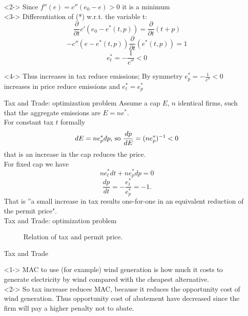 	<2-> Since $f''(e)=c''(e_0-e)>0$ it is a minimum \\


	<3-> Differentiation of (*) w.r.t. the variable t:
\[
\frac{\partial}{\partial{t}}c'(e_0-e^*(t,p))=\frac{\partial}{\partial{t}}(t+p)
\]
\[
-c''(e-e^*(t,p)) \frac{\partial}{\partial{t}} (e^*(t,p))=1
\]
\[
e^*_t=-\frac{1}{c''} < 0
\]


	<4-> Thus increases in tax reduce emissions; By symmetry $e^*_p = -\frac{1}{c''} < 0$ increases in price reduce emissions and $e^*_t=e^*_p$






{Tax and Trade: optimization problem}
Assume a cap $E$, $n$ identical firms, such that the aggregate emissions are $E=ne^*$. \\
For constant tax $t$ formally
\[
dE = ne^*_pdp \textnormal{, so } \frac{dp}{dE} = (ne^*_p)^{-1} < 0
\]
that is an increase in the cap reduces the price. \\
For fixed cap we have
\[
ne^*_tdt+ne^*_pdp=0
\]
\[
\frac{dp}{dt}=-\frac{e^*_t}{e^*_p}=-1.
\]
That is ''a small increase in tax results one-for-one in an equivalent reduction of the permit price". \\


{Tax and Trade: optimization problem}
\begin{center}
\begin{figure}[h!]
\centering
{}
\caption{Relation of tax and permit price.}
\end{figure}
\end{center}


{Tax and Trade}






	<1-> MAC to use (for example) wind generation is how much it costs to generate electricity by wind compared with the cheapest alternative. \\


	<2-> So tax increase reduces MAC, because it reduces the opportunity cost of wind generation. Thus opportunity cost of abatement have decreased since the firm will pay a higher penalty not to abate.


